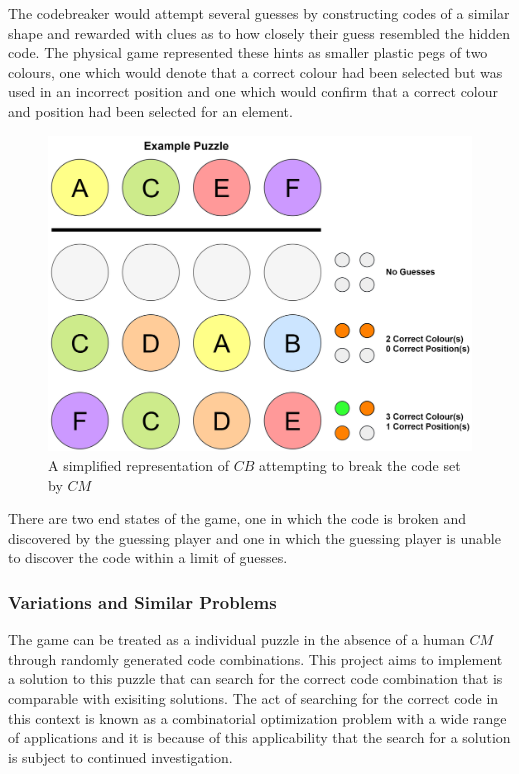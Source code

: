 \documentclass[12pt]{article}  %
\theoremstyle{definition}
\theoremstyle{remark}
\begin{document}
The codebreaker would attempt several guesses by constructing codes of a similar shape and rewarded with clues as to how closely their guess resembled the hidden code.
The physical game represented these hints as smaller plastic pegs of two colours, one which would denote that a correct colour had been selected but was used in an incorrect
position and one which would confirm that a correct colour and position had been selected for an element.
\begin{figure}[H]
\centering
\includegraphics[scale=0.5]{guesses}
\caption{A simplified representation of $CB$ attempting to break the code set by $CM$}
\end{figure}

There are two end states of the game, one in which the code is broken and discovered by the guessing player and one in which the guessing player is unable to discover the code
within a limit of guesses.

\subsubsection {Variations and Similar Problems}





The game can be treated as a individual puzzle in the absence of a human $CM$ through randomly generated code combinations. This project aims to implement a solution to this puzzle that can search for the correct code combination that is comparable with exisiting solutions. The act of searching for the correct code in this context is known as a combinatorial optimization problem with a wide range of applications \cite{Haystack} and it is because of this applicability that the search for a solution is subject to continued investigation.
\end{document}

